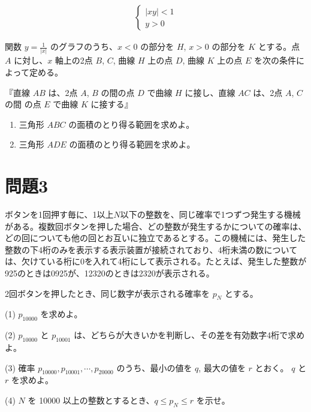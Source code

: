 \documentclass[unicode,12pt, A4j]{ltjsarticle}%
\begin{document}
\begin{align}
 \begin{cases}
|xy| < 1 \\
y > 0
\end{cases}
\end{align}

関数 $y = \frac{1}{|x|}$ のグラフのうち、$x < 0$ の部分を $H$, $x > 0$ の部分を $K$ とする。点 $A$ に対し、$x$ 軸上の2点 $B$, $C$, 曲線 $H$ 上の点 $D$, 曲線 $K$ 上の点 $E$ を次の条件によって定める。

『直線 $AB$ は、2点 $A$, $B$ の間の点 $D$ で曲線 $H$ に接し、直線 $AC$ は、2点 $A$, $C$ の間
の点 $E$ で曲線 $K$ に接する』

\begin{enumerate}
 \item 三角形 $ABC$ の面積のとり得る範囲を求めよ。
 \item 三角形 $ADE$ の面積のとり得る範囲を求めよ。
\end{enumerate}

\section{問題3}
ボタンを1回押す毎に、1以上$N$以下の整数を、同じ確率で1つずつ発生する機械がある。複数回ボタンを押した場合、どの整数が発生するかについての確率は、どの回についても他の回とお互いに独立であるとする。この機械には、発生した整数の下4桁のみを表示する表示装置が接続されており、4桁未満の数については、欠けている桁に0を入れて4桁にして表示される。たとえば、発生した整数が925のときは0925が、12320のときは2320が表示される。

2回ボタンを押したとき、同じ数字が表示される確率を $p_N$ とする。

(1) \quad $p_{10000}$ を求めよ。

(2) \quad $p_{10000}$ と $p_{10001}$ は、どちらが大きいかを判断し、その差を有効数字4桁で求めよ。

(3) \quad 確率 $p_{10000}, p_{10001}, \cdots, p_{20000}$ のうち、最小の値を $q$, 最大の値を $r$ とおく。 $q$ と
$r$ を求めよ。

(4) \quad $N$ を 10000 以上の整数とするとき、$q \leq p_N \leq r$ を示せ。
\end{document}

